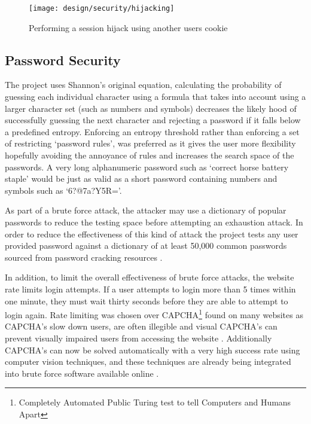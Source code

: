 \begin{figure}[h]
    \centering
    \texttt{[image: design/security/hijacking]}
    \caption[Performing a session hijack using another users cookie]{Performing a session hijack using another users cookie \parencite{owasp2011sessionhihacking}}
    \label{fig:securityhijacking}
\end{figure}

\subsection{Password Security}
 
The project uses Shannon's original equation, calculating the probability of guessing each individual character using a formula that takes into account using a larger character set (such as numbers and symbols) decreases the likely hood of successfully guessing the next character and rejecting a password if it falls below a predefined entropy.
%
Enforcing an entropy threshold rather than enforcing a set of restricting `password rules', was preferred as it gives the user more flexibility hopefully avoiding the annoyance of rules and increases the search space of the passwords. A very long alphanumeric password such as `correct horse battery staple' would be just as valid as a short password containing numbers and symbols such as `6?@7a?Y5R='.

As part of a brute force attack, the attacker may use a dictionary of popular passwords to reduce the testing space before attempting an exhaustion attack.
%
In order to reduce the effectiveness of this kind of attack the project tests any user provided password against a dictionary of at least 50,000 common passwords sourced from password cracking resources \cite{burr2013electronic}.

In addition, to limit the overall effectiveness of brute force attacks, the website rate limits login attempts. If a user attempts to login more than 5 times within one minute, they must wait thirty seconds before they are able to attempt to login again.
%
Rate limiting was chosen over CAPCHA\footnote{Completely Automated Public Turing test to tell Computers and Humans Apart} found on many websites as CAPCHA's slow down users, are often illegible and visual CAPCHA's can prevent visually impaired users from accessing the website \parencite{matt2005inaccessibility, hegarty2012onlinesecurity}. Additionally CAPCHA's can now be solved automatically with a very high success rate using computer vision techniques, and these techniques are already being integrated into brute force software available online \parencite{goodfellow2013neuralnetwork, 9kweu2014captchasolver, danchev2014captcha, savinkin2012captchasolvers}. 

